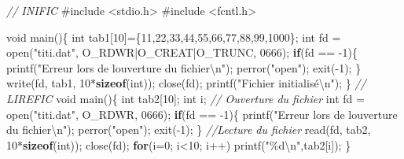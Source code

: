\documentclass[
]{article}
\newenvironment{Shaded}{}{}
\newcommand{\BaseNTok}[1]{\textcolor[rgb]{0.25,0.63,0.44}{#1}}
\newcommand{\CommentTok}[1]{\textcolor[rgb]{0.38,0.63,0.69}{\textit{#1}}}
\newcommand{\ControlFlowTok}[1]{\textcolor[rgb]{0.00,0.44,0.13}{\textbf{#1}}}
\newcommand{\DataTypeTok}[1]{\textcolor[rgb]{0.56,0.13,0.00}{#1}}
\newcommand{\DecValTok}[1]{\textcolor[rgb]{0.25,0.63,0.44}{#1}}
\newcommand{\ImportTok}[1]{#1}
\newcommand{\KeywordTok}[1]{\textcolor[rgb]{0.00,0.44,0.13}{\textbf{#1}}}
\newcommand{\NormalTok}[1]{#1}
\newcommand{\PreprocessorTok}[1]{\textcolor[rgb]{0.74,0.48,0.00}{#1}}
\newcommand{\SpecialCharTok}[1]{\textcolor[rgb]{0.25,0.44,0.63}{#1}}
\newcommand{\StringTok}[1]{\textcolor[rgb]{0.25,0.44,0.63}{#1}}
\begin{document}
\begin{Shaded}
\begin{Highlighting}[]
\CommentTok{// INIFIC}
\PreprocessorTok{\#include }\ImportTok{\textless{}stdio.h\textgreater{}}
\PreprocessorTok{\#include }\ImportTok{\textless{}fcntl.h\textgreater{}}

\DataTypeTok{void}\NormalTok{ main()\{}
    \DataTypeTok{int}\NormalTok{ tab1[}\DecValTok{10}\NormalTok{]=\{}\DecValTok{11}\NormalTok{,}\DecValTok{22}\NormalTok{,}\DecValTok{33}\NormalTok{,}\DecValTok{44}\NormalTok{,}\DecValTok{55}\NormalTok{,}\DecValTok{66}\NormalTok{,}\DecValTok{77}\NormalTok{,}\DecValTok{88}\NormalTok{,}\DecValTok{99}\NormalTok{,}\DecValTok{1000}\NormalTok{\};}
    \DataTypeTok{int}\NormalTok{ fd = open(}\StringTok{"titi.dat"}\NormalTok{, O\_RDWR|O\_CREAT|O\_TRUNC, }\BaseNTok{0666}\NormalTok{);}
    \ControlFlowTok{if}\NormalTok{(fd == {-}}\DecValTok{1}\NormalTok{)\{}
\NormalTok{        printf(}\StringTok{"Erreur lors de l\textquotesingle{}ouverture du fichier}\SpecialCharTok{\textbackslash{}n}\StringTok{"}\NormalTok{);}
\NormalTok{        perror(}\StringTok{"open"}\NormalTok{);}
\NormalTok{        exit({-}}\DecValTok{1}\NormalTok{);}
\NormalTok{    \}}
\NormalTok{    write(fd, tab1, }\DecValTok{10}\NormalTok{*}\KeywordTok{sizeof}\NormalTok{(}\DataTypeTok{int}\NormalTok{));}
\NormalTok{    close(fd);}
\NormalTok{    printf(}\StringTok{"Fichier initialisé}\SpecialCharTok{\textbackslash{}n}\StringTok{"}\NormalTok{);}
\NormalTok{\}}
\CommentTok{// LIREFIC}
\DataTypeTok{void}\NormalTok{ main()\{}
    \DataTypeTok{int}\NormalTok{ tab2[}\DecValTok{10}\NormalTok{];}
    \DataTypeTok{int}\NormalTok{ i;}
    \CommentTok{// Ouverture du fichier}
    \DataTypeTok{int}\NormalTok{ fd = open(}\StringTok{"titi.dat"}\NormalTok{, O\_RDWR, }\BaseNTok{0666}\NormalTok{);}
    \ControlFlowTok{if}\NormalTok{(fd == {-}}\DecValTok{1}\NormalTok{)\{}
\NormalTok{        printf(}\StringTok{"Erreur lors de l\textquotesingle{}ouverture du fichier}\SpecialCharTok{\textbackslash{}n}\StringTok{"}\NormalTok{);}
\NormalTok{        perror(}\StringTok{"open"}\NormalTok{);}
\NormalTok{        exit({-}}\DecValTok{1}\NormalTok{);}
\NormalTok{    \}}
    \CommentTok{//Lecture du fichier}
\NormalTok{    read(fd, tab2, }\DecValTok{10}\NormalTok{*}\KeywordTok{sizeof}\NormalTok{(}\DataTypeTok{int}\NormalTok{));}
\NormalTok{    close(fd);}
    \ControlFlowTok{for}\NormalTok{(i=}\DecValTok{0}\NormalTok{; i\textless{}}\DecValTok{10}\NormalTok{; i++) }
\NormalTok{        printf(}\StringTok{"\%d}\SpecialCharTok{\textbackslash{}n}\StringTok{"}\NormalTok{,tab2[i]);}
\NormalTok{\}}


\end{Highlighting}
\end{Shaded}
\end{document}
